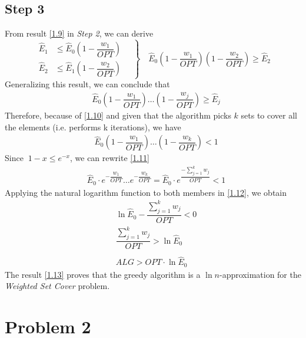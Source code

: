 \documentclass[a4paper,11pt]{article}
\begin{document}
\subsection{Step 3}
From result \ref{1.9} in \textit{Step 2}, we can derive
\begin{equation}
\left.\begin{aligned}
\hat{E}_{1} &\le \hat{E}_{0}\left( 1 -\dfrac{w_{1}}{OPT} \right)\\
\hat{E}_{2} &\le \hat{E}_{1}\left( 1 -\dfrac{w_{2}}{OPT} \right)
\end{aligned}
\quad \right\}
\quad \hat{E}_{0}\left( 1 -\dfrac{w_{1}}{OPT} \right) \left( 1 -\dfrac{w_{2}}{OPT} \right) \ge \hat{E}_{2} \nonumber
\end{equation}
Generalizing this result, we can conclude that
\begin{align}
&\hat{E}_{0}\left( 1 -\dfrac{w_{1}}{OPT} \right) \dots \left( 1 -\dfrac{w_{j}}{OPT} \right) \ge \hat{E}_{j} \label{1.10}
\end{align}
Therefore, because of \ref{1.10} and given that the algorithm picks $k$ sets to cover all the elements (i.e. performs k iterations), we have
\begin{align}
&\hat{E}_{0}\left( 1 -\dfrac{w_{1}}{OPT} \right) \dots \left( 1 -\dfrac{w_{k}}{OPT} \right) < 1 \label{1.11}
\end{align}
Since $\ 1-x \le e^{-x}$, we can rewrite \ref{1.11}
\begin{align}
&\hat{E}_{0} \cdot e^{-\dfrac{w_{1}}{OPT}} \dots e^{-\dfrac{w_{k}}{OPT}} = \hat{E}_{0} \cdot e^{\dfrac{-\sum\limits_{j = 1}^{k}w_{j}}{OPT}} < 1 \label{1.12}
\end{align}
Applying the natural logarithm function to both members in \ref{1.12}, we obtain
\begin{align}
&\ln\hat{E}_{0} - \dfrac{\sum\limits_{j = 1}^{k}w_{j}}{OPT} < 0 \nonumber\\
&\dfrac{\sum\limits_{j = 1}^{k}w_{j}}{OPT} > \ln\hat{E}_{0} \nonumber\\
\nonumber\\
&ALG > OPT \cdot \ln\hat{E}_{0} \label{1.13}
\end{align}
The result \ref{1.13} proves that the greedy algorithm is a $\ln n$-approximation for the \textit{Weighted Set Cover} problem.


\newpage
\section{Problem 2}
\end{document}
